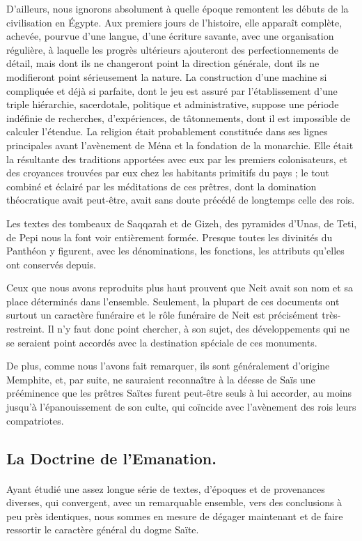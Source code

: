 \documentclass[a4paper, 11pt, oneside]{article}
\begin{document}
D'ailleurs, nous ignorons absolument à quelle époque remontent les débuts de la civilisation en Égypte. Aux premiers jours de l'histoire, elle apparaît complète, achevée, pourvue d'une langue, d’une écriture savante, avec une organisation régulière, à laquelle les progrès ultérieurs ajouteront des perfectionnements de détail, mais dont ils ne changeront point la direction générale, dont ils ne modifieront point sérieusement la nature. La construction d'une machine si compliquée et déjà si parfaite, dont le jeu est assuré par l'établissement d'une triple hiérarchie, sacerdotale, politique et administrative, suppose une période indéfinie de recherches, d'expériences, de tâtonnements, dont il est impossible de calculer l'étendue. La religion était probablement constituée dans ses lignes principales avant l'avènement de Ména et la fondation de la monarchie. Elle était la résultante des traditions apportées avec eux par les premiers colonisateurs, et des croyances trouvées par eux chez les habitants primitifs du pays ; le tout combiné et éclairé par les méditations de ces prêtres, dont la domination théocratique avait peut-être, avait sans doute précédé de longtemps celle des rois.

Les textes des tombeaux de Saqqarah et de Gizeh, des pyramides d'Unas, de Teti, de Pepi nous la font voir entièrement formée. Presque toutes les divinités du Panthéon y figurent, avec les dénominations, les fonctions, les attributs qu'elles ont conservés depuis.

Ceux que nous avons reproduits plus haut prouvent que Neit avait son nom et sa place déterminés dans l'ensemble. Seulement, la plupart de ces documents ont surtout un caractère funéraire et le rôle funéraire de Neit est précisément très-restreint. Il n'y faut donc point chercher, à son sujet, des développements qui ne se seraient point accordés avec la destination spéciale de ces monuments.

De plus, comme nous l'avons fait remarquer, ils sont généralement d'origine Memphite, et, par suite, ne sauraient reconnaître à la déesse de Saïs une prééminence que les prêtres Saïtes furent peut-être seuls à lui accorder, au moins jusqu'à l'épanouissement de son culte, qui coïncide avec l'avènement des rois leurs compatriotes.
\clearpage
\subsection{La Doctrine de l'Emanation.}
\paragraph{}
Ayant étudié une assez longue série de textes, d'époques et de provenances diverses, qui convergent, avec un remarquable ensemble, vers des conclusions à peu près identiques, nous sommes en mesure de dégager maintenant et de faire ressortir le caractère général du dogme Saïte.
\end{document}
